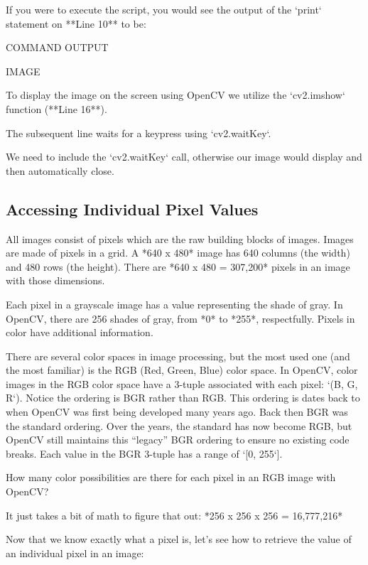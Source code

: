 If you were to execute the script, you would see the output of the `print` statement on **Line 10** to be:

COMMAND OUTPUT

IMAGE

To display the image on the screen using OpenCV we utilize the `cv2.imshow` function (**Line 16**).

The subsequent line waits for a keypress using `cv2.waitKey`.

We need to include the `cv2.waitKey` call, otherwise our image would display and then automatically close.


\subsection{Accessing Individual Pixel Values}

All images consist of pixels which are the raw building blocks of images. Images are made of pixels in a grid. A *640 x 480* image has 640 columns (the width) and 480 rows (the height). There are *640 x 480 = 307,200* pixels in an image with those dimensions.

Each pixel in a grayscale image has a value representing the shade of gray. In OpenCV, there are 256 shades of gray, from *0* to *255*, respectfully.
Pixels in color have additional information.

There are several color spaces in image processing, but the most used one (and the most familiar) is the RGB (Red, Green, Blue) color space. In OpenCV, color images in the RGB color space have a 3-tuple associated with each pixel: `(B, G, R`). Notice the ordering is BGR rather than RGB. This ordering is dates back to when OpenCV was first being developed many years ago. Back then BGR was the standard ordering. Over the years, the standard has now become RGB, but OpenCV still maintains this “legacy” BGR ordering to ensure no existing code breaks. Each value in the BGR 3-tuple has a range of `[0, 255`].

How many color possibilities are there for each pixel in an RGB image with OpenCV?

It just takes a bit of math to figure that out:
*256 x 256 x 256 = 16,777,216*

Now that we know exactly what a pixel is, let’s see how to retrieve the value of an individual pixel in an image:

